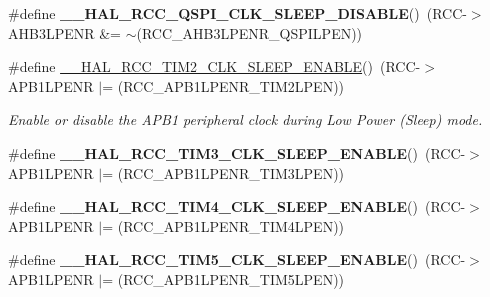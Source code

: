 \begin{DoxyCompactItemize}
\item 
\mbox{\label{group___r_c_c_ex___peripheral___clock___sleep___enable___disable_ga89f565eece1302ef852333fb1ccf063d}} 
\#define {\bfseries \+\_\+\+\_\+\+H\+A\+L\+\_\+\+R\+C\+C\+\_\+\+Q\+S\+P\+I\+\_\+\+C\+L\+K\+\_\+\+S\+L\+E\+E\+P\+\_\+\+D\+I\+S\+A\+B\+LE}()~(R\+CC-\/$>$A\+H\+B3\+L\+P\+E\+NR \&= $\sim$(R\+C\+C\+\_\+\+A\+H\+B3\+L\+P\+E\+N\+R\+\_\+\+Q\+S\+P\+I\+L\+P\+EN))
\item 
\#define \mbox{\hyperlink{group___r_c_c_ex___peripheral___clock___sleep___enable___disable_ga975142c90b4e1baf21b361524518235d}{\+\_\+\+\_\+\+H\+A\+L\+\_\+\+R\+C\+C\+\_\+\+T\+I\+M2\+\_\+\+C\+L\+K\+\_\+\+S\+L\+E\+E\+P\+\_\+\+E\+N\+A\+B\+LE}}()~(R\+CC-\/$>$A\+P\+B1\+L\+P\+E\+NR $\vert$= (R\+C\+C\+\_\+\+A\+P\+B1\+L\+P\+E\+N\+R\+\_\+\+T\+I\+M2\+L\+P\+EN))
\begin{DoxyCompactList}\small\item\em Enable or disable the A\+P\+B1 peripheral clock during Low Power (Sleep) mode. \end{DoxyCompactList}\item 
\mbox{\label{group___r_c_c_ex___peripheral___clock___sleep___enable___disable_ga2e165dd342f4ab6ea9b2edab08723cf8}} 
\#define {\bfseries \+\_\+\+\_\+\+H\+A\+L\+\_\+\+R\+C\+C\+\_\+\+T\+I\+M3\+\_\+\+C\+L\+K\+\_\+\+S\+L\+E\+E\+P\+\_\+\+E\+N\+A\+B\+LE}()~(R\+CC-\/$>$A\+P\+B1\+L\+P\+E\+NR $\vert$= (R\+C\+C\+\_\+\+A\+P\+B1\+L\+P\+E\+N\+R\+\_\+\+T\+I\+M3\+L\+P\+EN))
\item 
\mbox{\label{group___r_c_c_ex___peripheral___clock___sleep___enable___disable_ga7911836a0e66ab2e4719b298f74b783b}} 
\#define {\bfseries \+\_\+\+\_\+\+H\+A\+L\+\_\+\+R\+C\+C\+\_\+\+T\+I\+M4\+\_\+\+C\+L\+K\+\_\+\+S\+L\+E\+E\+P\+\_\+\+E\+N\+A\+B\+LE}()~(R\+CC-\/$>$A\+P\+B1\+L\+P\+E\+NR $\vert$= (R\+C\+C\+\_\+\+A\+P\+B1\+L\+P\+E\+N\+R\+\_\+\+T\+I\+M4\+L\+P\+EN))
\item 
\mbox{\label{group___r_c_c_ex___peripheral___clock___sleep___enable___disable_gae99e46f9e40655dc9b5c07b03fdc4a4e}} 
\#define {\bfseries \+\_\+\+\_\+\+H\+A\+L\+\_\+\+R\+C\+C\+\_\+\+T\+I\+M5\+\_\+\+C\+L\+K\+\_\+\+S\+L\+E\+E\+P\+\_\+\+E\+N\+A\+B\+LE}()~(R\+CC-\/$>$A\+P\+B1\+L\+P\+E\+NR $\vert$= (R\+C\+C\+\_\+\+A\+P\+B1\+L\+P\+E\+N\+R\+\_\+\+T\+I\+M5\+L\+P\+EN))

\end{DoxyCompactItemize}
